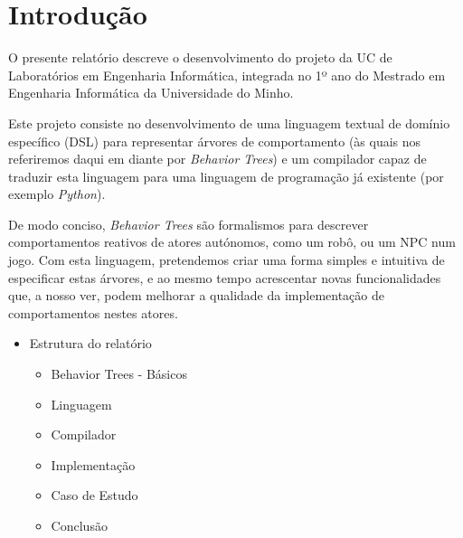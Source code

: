
\chapter{Introdução} %

\label{Chapter1} %


\newcommand{\keyword}[1]{\textbf{#1}}
\newcommand{\tabhead}[1]{\textbf{#1}}
\newcommand{\code}[1]{\texttt{#1}}
\newcommand{\file}[1]{\texttt{\bfseries#1}}
\newcommand{\option}[1]{\texttt{\itshape#1}}


O presente relatório descreve o desenvolvimento do projeto da UC de Laboratórios em Engenharia Informática, integrada no 1º ano do Mestrado em Engenharia Informática da Universidade do Minho.

Este projeto consiste no desenvolvimento de uma linguagem textual de domínio específico (DSL) para representar árvores de comportamento (às quais nos referiremos daqui em diante por \textit{Behavior Trees}) e um compilador capaz de traduzir esta linguagem para uma linguagem de programação já existente (por exemplo \textit{Python}).

De modo conciso, \textit{Behavior Trees} são formalismos para descrever comportamentos reativos de atores autónomos, como um robô, ou um NPC num jogo.
Com esta linguagem, pretendemos criar uma forma simples e intuitiva de especificar estas árvores, e ao mesmo tempo acrescentar novas funcionalidades que, a nosso ver, podem melhorar a qualidade da implementação de comportamentos nestes atores.


\begin{itemize}
    \item Estrutura do relatório
    \begin{itemize}
        \item Behavior Trees - Básicos
        \item Linguagem
        \item Compilador
        \item Implementação
        \item Caso de Estudo
        \item Conclusão
    \end{itemize}

\end{itemize}

